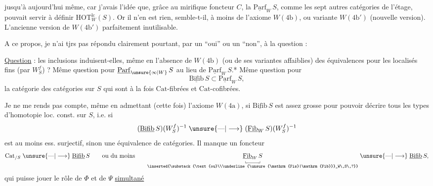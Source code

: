 jusqu'à aujourd'hui même, car j'avais l'idée
que, grâce au mirifique foncteur $C$, la 
$\underline{\mathrm{Parf}}_W\,S$, comme les sept autres catégories de l'étage,
pouvait servir à définir $\mathrm{HOT}_W^{\mathrm{lc}}(S)$. Or il n'en est
rien, semble-t-il, à moins de  l'axiome
$W(4\mathrm b)$, ou  variante $W(4\mathrm b')$ (nouvelle
version). L'ancienne version de $W(4\mathrm b')$ 
parfaitement inutilisable.

A ce propos, je n'ai tjrs pas répondu clairement
pourtant, par un ``oui'' ou un ``non'', à la question :

\uline{Question} : les inclusions
induisent-elles, même en l'absence de $W(4\mathrm b)$
(ou de ses variantes affaiblies) des équivalences
pour les localisés fins (par $W_S^f$) ? Même
question pour $\underline{\mathrm{Parf}}_{\unsure{\infty|W}}\,S$ au lieu de $\underline{\mathrm{Parf}}_W\,S$.* 
Même question pour
\[
\underline{\mathrm{Bifib}}\,S\subset\underline{\mathrm{Parf}}_W\,S,
\]
la catégorie des catégories  sur $S$ qui sont à
la fois $\mathrm{Cat}$-fibrées et $\mathrm{Cat}$-cofibrées. 

Je ne me rends pas compte,  même en
admettant (cette fois) l'axiome $W(4\mathrm a)$, si
$\underline{\mathrm{Bifib}}\,S$ est assez grosse pour pouvoir décrire tous
les types d'homotopie  loc. const. sur $S$, i.e. si
\[
(\underline{\mathrm{Bifib}}\,S)(W_S^f)^{-1}\mathrel{\unsure{\text{---}|\longrightarrow}}
(\underline{\mathrm{Fib}}_W\,S)(W_S^f)^{-1}
\]
est au moins ess. surjectif, sinon une équivalence de
catégories. Il manque un foncteur
\[
\mathrm{Cat}_{/S}\mathrel{\unsure{\text{---}|\longrightarrow}}\underline{\mathrm{Bifib}}\,S
\qquad\text{ou du moins}\qquad
\underset{\inserted{\substack{\text{ou}\\\underline{\unsure{\mathrm{Fis}|\mathrm{Fib}}}_W\,S\,?}}}{\underset{\llcorner\!\rule{2em}{.35pt}\!\lrcorner}{\underline{\mathrm{Fib}}_W\,S}}
\mathrel{\unsure{\text{---}|\longrightarrow}}\underline{\mathrm{Bifib}}\,S,
\]
qui  puisse jouer le rôle de $\Phi$ et de $\Psi$ \uline{simultané}%
